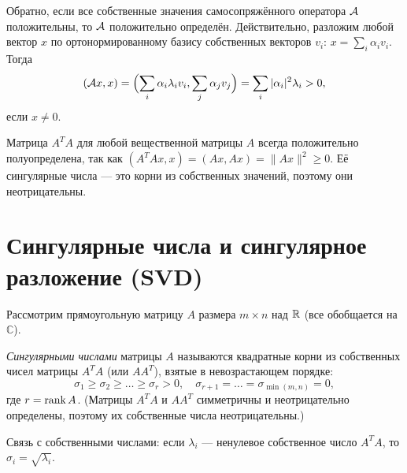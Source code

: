 \documentclass[10pt]{article}
\begin{document}
\begin{corollary}
    Обратно, если все собственные значения самосопряжённого оператора $\mathcal{A}$ положительны, то $\mathcal{A}$ положительно определён. Действительно, разложим любой вектор $x$ по ортонормированному базису собственных векторов $v_i$: $x = \sum_i \alpha_i v_i$. Тогда
    \[
    (\mathcal{A} x, x) = \Bigl(\sum_i \alpha_i \lambda_i v_i, \sum_j \alpha_j v_j\Bigr) = \sum_i |\alpha_i|^2 \lambda_i > 0,
    \]
    если $x \neq 0$.
\end{corollary}

\begin{example}
    Матрица $A^T A$ для любой вещественной матрицы $A$ всегда положительно полуопределена, так как $(A^T A x, x) = (A x, A x) = \|A x\|^2 \ge 0$. Её сингулярные числа — это корни из собственных значений, поэтому они неотрицательны.
\end{example}

\section{Сингулярные числа и сингулярное разложение (SVD)}

Рассмотрим прямоугольную матрицу $A$ размера $m\times n$ над $\mathbb{R}$ (все обобщается на $\mathbb{C}$).

\begin{definition}
    \textit{Сингулярными числами} матрицы $A$ называются квадратные корни из собственных чисел матрицы $A^T A$ (или $AA^T$), взятые в невозрастающем порядке:
    \[
    \sigma_1 \ge \sigma_2 \ge \dots \ge \sigma_r > 0, \quad \sigma_{r+1}=\dots=\sigma_{\min(m,n)}=0,
    \]
    где $r = \operatorname{rank} A$. (Матрицы $A^T A$ и $AA^T$ симметричны и неотрицательно определены, поэтому их собственные числа неотрицательны.)
\end{definition}

Связь с собственными числами: если $\lambda_i$ --- ненулевое собственное число $A^T A$, то $\sigma_i = \sqrt{\lambda_i}$.
\end{document}

